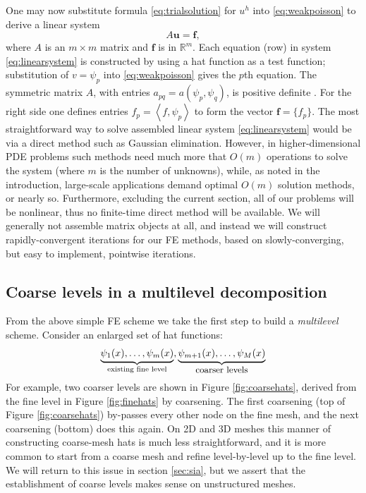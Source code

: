 \documentclass[letterpaper,final,12pt,reqno]{amsart}
\theoremstyle{claim}
\newcommand{\RR}{\mathbb{R}}
\newcommand{\bbf}{\mathbf{f}}
\newcommand{\bu}{\mathbf{u}}
\newcommand{\ip}[2]{\left<#1,#2\right>}
\numberwithin{equation}{section}
\numberwithin{figure}{section}
\numberwithin{table}{section}
\begin{document}
One may now substitute formula \eqref{eq:trialsolution} for $u^h$ into \eqref{eq:weakpoisson} to derive a linear system
\begin{equation}
A \bu = \bbf, \label{eq:linearsystem}
\end{equation}
where $A$ is an $m\times m$ matrix and $\bbf$ is in $\RR^m$.  Each equation (row) in system \eqref{eq:linearsystem} is constructed by using a hat function as a test function; substitution of $v=\psi_p$ into \eqref{eq:weakpoisson} gives the $p$th equation.  The symmetric matrix $A$, with entries $a_{pq} = a(\psi_p,\psi_q)$, is positive definite \cite{Elmanetal2014}.  For the right side one defines entries $f_p = \ip{f}{\psi_p}$ to form the vector $\bbf = \{f_p\}$.  The most straightforward way to solve assembled linear system \eqref{eq:linearsystem} would be via a direct method such as Gaussian elimination.  However, in higher-dimensional PDE problems such methods need much more that $O(m)$ operations to solve the system (where $m$ is the number of unknowns), while, as noted in the introduction, large-scale applications demand optimal $O(m)$ solution methods, or nearly so.  Furthermore, excluding the current section, all of our problems will be nonlinear, thus no finite-time direct method will be available.  We will generally not assemble matrix objects at all, and instead we will construct rapidly-convergent iterations for our FE methods, based on slowly-converging, but easy to implement, pointwise iterations.

\subsection*{Coarse levels in a multilevel decomposition}  From the above simple FE scheme we take the first step to build a \emph{multilevel} scheme.  Consider an enlarged set of hat functions:
    $$\underbrace{\psi_1(x),\dots,\psi_m(x)}_{\text{existing fine level}},\underbrace{\psi_{m+1}(x),\dots,\psi_M(x)}_{\text{\small coarser levels}}$$
For example, two coarser levels are shown in Figure \ref{fig:coarsehats}, derived from the fine level in Figure \ref{fig:finehats} by coarsening.  The first coarsening (top of Figure \ref{fig:coarsehats}) by-passes every other node on the fine mesh, and the next coarsening (bottom) does this again.  On 2D and 3D meshes this manner of constructing coarse-mesh hats is much less straightforward, and it is more common to start from a coarse mesh and refine level-by-level up to the fine level.  We will return to this issue in section \ref{sec:sia}, but we assert that the establishment of coarse levels makes sense on unstructured meshes.
\end{document}
